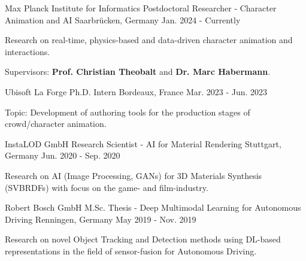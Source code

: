 

\begin{cventries}

\cventry
  {Max Planck Institute for Informatics} %
  {Postdoctoral Researcher - Character Animation and AI} %
  {Saarbrücken, Germany} %
  {Jan. 2024 - Currently} %
  {
    \begin{cvitems} %
      \item {Research on real-time, physics-based and data-driven character animation and interactions.}
      \item {Supervisors: \textbf{Prof. Christian Theobalt} and \textbf{Dr. Marc Habermann}.}
    \end{cvitems}
  }

  \cventry
    {Ubisoft La Forge} %
    {Ph.D. Intern} %
    {Bordeaux, France} %
    {Mar. 2023 - Jun. 2023} %
    {
      \begin{cvitems} %
        \item {Topic: Development of authoring tools for the production stages of crowd/character animation.}
      \end{cvitems}
    }

\cventry
    {InstaLOD GmbH} %
    {Research Scientist - AI for Material Rendering} %
    {Stuttgart, Germany} %
    {Jun. 2020 - Sep. 2020} %
    {
      \begin{cvitems} %
        \item {Research on AI (Image Processing, GANs) for 3D Materials Synthesis (SVBRDFs) with focus on the game- and film-industry.}
      \end{cvitems}
    }

\cventry
    {Robert Bosch GmbH} %
    {M.Sc. Thesis - Deep Multimodal Learning for Autonomous Driving} %
    {Renningen, Germany} %
    {May 2019 - Nov. 2019} %
    {
      \begin{cvitems} %
        \item {Research on novel Object Tracking and Detection methods using DL-based representations in the field of sensor-fusion for Autonomous Driving.}
      \end{cvitems}
    }


\end{cventries}
